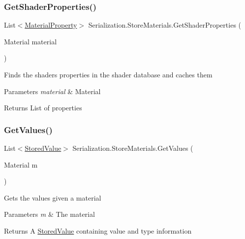 \subsubsection{\texorpdfstring{Get\+Shader\+Properties()}{GetShaderProperties()}}
{\footnotesize\ttfamily List$<$\hyperlink{class_serialization_1_1_store_materials_1_1_material_property}{Material\+Property}$>$ Serialization.\+Store\+Materials.\+Get\+Shader\+Properties (\begin{DoxyParamCaption}\item[{Material}]{material }\end{DoxyParamCaption})\hspace{0.3cm}{\ttfamily [inline]}}



Finds the shader\textquotesingle{}s properties in the shader database and caches them 


\begin{DoxyParams}{Parameters}
{\em material} & Material\\
\hline
\end{DoxyParams}
\begin{DoxyReturn}{Returns}
List of properties
\end{DoxyReturn}
\mbox{\label{class_serialization_1_1_store_materials_a09c007367c6e8107eb78de40955fce71}} 
\subsubsection{\texorpdfstring{Get\+Values()}{GetValues()}}
{\footnotesize\ttfamily List$<$\hyperlink{class_serialization_1_1_store_materials_1_1_stored_value}{Stored\+Value}$>$ Serialization.\+Store\+Materials.\+Get\+Values (\begin{DoxyParamCaption}\item[{Material}]{m }\end{DoxyParamCaption})\hspace{0.3cm}{\ttfamily [inline]}}



Gets the values given a material 


\begin{DoxyParams}{Parameters}
{\em m} & The material\\
\hline
\end{DoxyParams}
\begin{DoxyReturn}{Returns}
A \hyperlink{class_serialization_1_1_store_materials_1_1_stored_value}{Stored\+Value} containing value and type information
\end{DoxyReturn}
\mbox{\label{class_serialization_1_1_store_materials_aeff125c4b2f6d2e248ac34bcd2a533b1}} 
